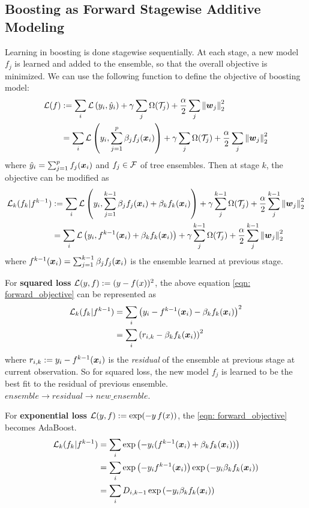 \documentclass[11pt]{article}
\begin{document}
\subsection{Boosting as Forward Stagewise Additive Modeling}
Learning in boosting is done stagewise sequentially. At each stage, a new model $f_{j}$ is learned and added to the ensemble, so that the overall objective is minimized. We can use the following function to define the objective of boosting model:
 \begin{align*}
{\mathcal L}(f) &:= \sum_{i}{\mathcal L}\left(y_i, \hat{y}_{i}\right) +\gamma  \sum_{j}\Omega({\mathcal T}_{j}) + \frac{\alpha}{2} \sum_{j}\left\|\boldsymbol{w}_{j}\right\|_{2}^{2} \\
&= \sum_{i}{\mathcal L}\left(y_i,  \sum_{j=1}^{p}\beta_{j}f_j(\boldsymbol{x}_{i})\right)  +\gamma  \sum_{j}\Omega({\mathcal T}_{j}) + \frac{\alpha}{2} \sum_{j}\left\|\boldsymbol{w}_{j}\right\|_{2}^{2}
\end{align*} where $ \hat{y}_{i} = \sum_{j=1}^{p}f_j(\boldsymbol{x}_{i})$ and $f_{j} \in {\mathcal F}$ of tree ensembles. Then at stage $k$, the objective can be modified as 
 \begin{align}
{\mathcal L}_{k}(f_{k} | f^{k-1}) &:= \sum_{i}{\mathcal L}\left(y_i,  \sum_{j=1}^{k-1}\beta_{j}f_j(\boldsymbol{x}_{i}) + \beta_{k}f_{k}(\boldsymbol{x}_{i})\right)  +\gamma  \sum_{j}^{k-1}\Omega({\mathcal T}_{j}) + \frac{\alpha}{2} \sum_{j}^{k-1}\left\|\boldsymbol{w}_{j}\right\|_{2}^{2} \nonumber\\
&= \sum_{i}{\mathcal L}\left(y_i, f^{k-1}(\boldsymbol{x}_{i}) +\beta_{k} f_{k}(\boldsymbol{x}_{i})\right)  +\gamma  \sum_{j}^{k-1}\Omega({\mathcal T}_{j}) + \frac{\alpha}{2} \sum_{j}^{k-1}\left\|\boldsymbol{w}_{j}\right\|_{2}^{2} \label{eqn: forward_objective}
\end{align} where $f^{k-1}(\boldsymbol{x}_{i}) = \sum_{j=1}^{k-1}\beta_{j}f_j(\boldsymbol{x}_{i})$ is the ensemble learned at previous stage.

For \textbf{squared loss} ${\mathcal L}(y,f) := (y-f(x))^2$, the above equation \eqref{eqn: forward_objective} can be represented as 
\begin{align*}
{\mathcal L}_{k}(f_{k} | f^{k-1}) &= \sum_{i}\left(y_i - f^{k-1}(\boldsymbol{x}_{i}) - \beta_{k} f_{k}(\boldsymbol{x}_{i})\right)^2 \\
&=  \sum_{i}\left(r_{i,k} - \beta_{k} f_{k}(\boldsymbol{x}_{i})\right)^2 
\end{align*} where $r_{i,k}:= y_i - f^{k-1}(\boldsymbol{x}_{i})$ is the \emph{residual} of the ensemble at previous stage at current observation. So for squared loss, the new model $f_{j}$ is learned to be the best fit to the residual of previous ensemble. $ensemble \rightarrow residual \rightarrow new\_ensemble$.

For \textbf{exponential loss} ${\mathcal L}(y,f) := \exp(-y\,f(x))$, the \eqref{eqn: forward_objective} becomes AdaBoost. 
\begin{align*}
{\mathcal L}_{k}(f_{k} | f^{k-1}) &= \sum_{i}\exp\left(-y_i (f^{k-1}(\boldsymbol{x}_{i}) + \beta_{k} f_{k}(\boldsymbol{x}_{i}))\right) \\
&=  \sum_{i}\exp\left(-y_i f^{k-1}(\boldsymbol{x}_{i})\right) \exp\left( -y_{i}\beta_{k} f_{k}(\boldsymbol{x}_{i})\right) \\
&=  \sum_{i}D_{i,k-1} \exp\left( -y_{i}\beta_{k} f_{k}(\boldsymbol{x}_{i})\right)
\end{align*}
\end{document}
